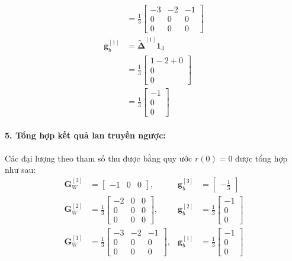 \begin{itemize}
\begin{align*}
    &= \frac{1}{3}\begin{bmatrix} -3 & -2 & -1 \\ 0 & 0 & 0 \\ 0 & 0 & 0 \end{bmatrix} \\
    \mathbf{g}_b^{[1]} &= \widetilde{\boldsymbol{\Delta}}^{[1]}\mathbf{1}_3 \\
    &= \frac{1}{3}\begin{bmatrix} 1 - 2 + 0 \\ 0 \\ 0 \end{bmatrix} \\
    &= \frac{1}{3}\begin{bmatrix} -1 \\ 0 \\ 0 \end{bmatrix}
    \end{align*}
\end{itemize}

\paragraph{5. Tổng hợp kết quả lan truyền ngược:}
Các đại lượng theo tham số thu được bằng quy ước $r(0)=0$ được tổng hợp như sau:
\begin{align*}
\mathbf{G}_W^{[3]} &= \begin{bmatrix} -1 & 0 & 0 \end{bmatrix}, & \mathbf{g}_b^{[3]} &= \begin{bmatrix} -\frac{1}{3} \end{bmatrix} \\
\mathbf{G}_W^{[2]} &= \frac{1}{3}\begin{bmatrix} -2 & 0 & 0 \\ 0 & 0 & 0 \\ 0 & 0 & 0 \end{bmatrix}, & \mathbf{g}_b^{[2]} &= \frac{1}{3}\begin{bmatrix} -1 \\ 0 \\ 0 \end{bmatrix} \\
\mathbf{G}_W^{[1]} &= \frac{1}{3}\begin{bmatrix} -3 & -2 & -1 \\ 0 & 0 & 0 \\ 0 & 0 & 0 \end{bmatrix}, & \mathbf{g}_b^{[1]} &= \frac{1}{3}\begin{bmatrix} -1 \\ 0 \\ 0 \end{bmatrix}
\end{align*}

